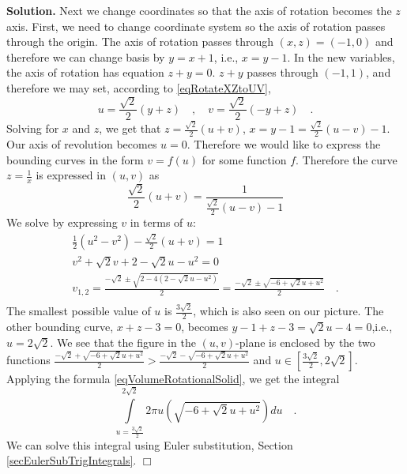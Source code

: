\documentclass[12pt]{book}
\newenvironment{solution}{\medskip\noindent\textbf{Solution.} }{$\Box$}
\begin{document}
\begin{solution}
Next we change coordinates so that the axis of rotation becomes the $z$ axis. First, we need to change coordinate system so the axis of rotation passes through the origin. The axis of rotation passes through $(x,z)=(-1,0)$ and therefore we can change basis by $y=x+1$, i.e., $x=y-1$. In the new variables, the axis of rotation has equation $z+y=0$. $z+y$ passes through $(-1,1)$, and therefore we may set, according to \eqref{eqRotateXZtoUV},
\[
u=\frac{\sqrt{2}}{2}(y+z)\quad,\quad v=\frac{\sqrt{2}}{2}(-y+z)\quad .
\]
Solving for $x$ and $z$, we get that $z=\frac{\sqrt{2}}{2}(u+v)$, $x=y-1=\frac{\sqrt{2}}{2}(u-v)-1$. Our axis of revolution becomes $u=0$. Therefore we would like to express the bounding curves in the form $v=f(u)$ for some function $f$. Therefore the curve $z=\frac{1}{x}$ is expressed in $(u,v)$ as
\[
\frac{\sqrt{2}}{2}(u+v)= \frac{1}{\frac{\sqrt{2}}{2}(u-v)-1}
\]
We solve by expressing $v$ in terms of $u$:
\[
\begin{array}{l}
\frac{1}{2}(u^2-v^2)-\frac{\sqrt{2}}{2}(u+v)=1 \\
v^2+\sqrt{2}v+2-\sqrt{2}u- u^2=0 \\
v_{1,2}=\frac{-\sqrt{2}\pm \sqrt{2-4(2-\sqrt{2}u- u^2)} }2=
\frac{-\sqrt{2}\pm \sqrt{-6+\sqrt{2}u+ u^2} }2\quad .
\\
\end{array}
\]
The smallest possible value of $u$ is $\frac{3\sqrt{2}}2$, which is also seen on our picture.  The other bounding curve, $x+z-3=0$, becomes $y-1+z-3=\sqrt{2}u -4=0 $,i.e., $u=2\sqrt{2}$. We see that the figure in the $(u,v)$-plane is enclosed by the two functions $\frac{-\sqrt{2}+ \sqrt{-6+\sqrt{2}u+ u^2} }2>\frac{-\sqrt{2}- \sqrt{-6+\sqrt{2}u+ u^2} }2$ and $u\in [\frac{3\sqrt{2}}2, 2\sqrt{2}]$.  Applying the formula \eqref{eqVolumeRotationalSolid}, we get the integral
\[
\int\limits_{u=\frac{3\sqrt{2}}2}^{2\sqrt{2}} 2\pi u\left(\sqrt{-6+\sqrt{2}u+ u^2}\right)du\quad .
\]
We can solve this integral using Euler substitution, Section \ref{secEulerSubTrigIntegrals}. %
\end{solution}
\end{document}
